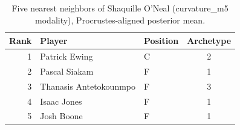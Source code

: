 \begin{table}[htbp]
  \centering\small
  \begin{tabular}{rllc}
    \toprule
    Rank & Player & Position & Archetype \\
    \midrule
    1 & Patrick Ewing & C & 2 \\
    2 & Pascal Siakam & F & 1 \\
    3 & Thanasis Antetokounmpo & F & 3 \\
    4 & Isaac Jones & F & 1 \\
    5 & Josh Boone & F & 1 \\
    \bottomrule
  \end{tabular}
  \caption{Five nearest neighbors of Shaquille O'Neal (curvature_m5 modality), Procrustes-aligned posterior mean.}
  \label{tab:Shaquille_O_Neal_neighbors_curvature_m5}
\end{table}


